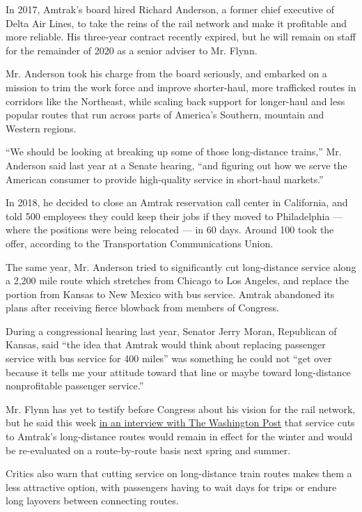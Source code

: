 In 2017, Amtrak's board hired Richard Anderson, a former chief executive
of Delta Air Lines, to take the reins of the rail network and make it
profitable and more reliable. His three-year contract recently expired,
but he will remain on staff for the remainder of 2020 as a senior
adviser to Mr. Flynn.

Mr. Anderson took his charge from the board seriously, and embarked on a
mission to trim the work force and improve shorter-haul, more trafficked
routes in corridors like the Northeast, while scaling back support for
longer-haul and less popular routes that run across parts of America's
Southern, mountain and Western regions.

``We should be looking at breaking up some of those long-distance
trains,'' Mr. Anderson said last year at a Senate hearing, ``and
figuring out how we serve the American consumer to provide high-quality
service in short-haul markets.''

In 2018, he decided to close an Amtrak reservation call center in
California, and told 500 employees they could keep their jobs if they
moved to Philadelphia --- where the positions were being relocated ---
in 60 days. Around 100 took the offer, according to the Transportation
Communications Union.

The same year, Mr. Anderson tried to significantly cut long-distance
service along a 2,200 mile route which stretches from Chicago to Los
Angeles, and replace the portion from Kansas to New Mexico with bus
service. Amtrak abandoned its plans after receiving fierce blowback from
members of Congress.

During a congressional hearing last year, Senator Jerry Moran,
Republican of Kansas, said ``the idea that Amtrak would think about
replacing passenger service with bus service for 400 miles'' was
something he could not ``get over because it tells me your attitude
toward that line or maybe toward long-distance nonprofitable passenger
service.''

Mr. Flynn has yet to testify before Congress about his vision for the
rail network, but he said this week
\href{https://www.washingtonpost.com/washington-post-live-amtrak-ceo-william-flynn/}{in
an interview with The Washington Post} that service cuts to Amtrak's
long-distance routes would remain in effect for the winter and would be
re-evaluated on a route-by-route basis next spring and summer.

Critics also warn that cutting service on long-distance train routes
makes them a less attractive option, with passengers having to wait days
for trips or endure long layovers between connecting routes.

